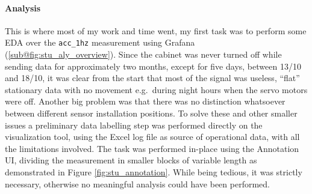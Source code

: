\paragraph{Analysis}
This is where most of my work and time went, my first task was to perform some \acl{EDA} over the \texttt{acc\_1hz} measurement using Grafana (\ref{sub@fig:stu_aly_overview}).
Since the cabinet was never turned off while sending data for approximately two months, except for five days, between 13/10 and 18/10, it was clear from the start that most of 
the signal was useless, ``flat'' stationary data with no movement e.g.\ during night hours when the servo motors were off. 
Another big problem was that there was no distinction whatsoever between different sensor installation positions.
To solve these and other smaller issues a preliminary data labelling step was performed directly on the visualization tool, using the Excel log file as source of 
operational data, with all the limitations involved. The task was performed in-place using the Annotation UI, dividing the measurement in smaller blocks of variable length 
as demonstrated in Figure \ref{fig:stu_annotation}. While being tedious, it was strictly necessary, otherwise no meaningful analysis could have been performed.

